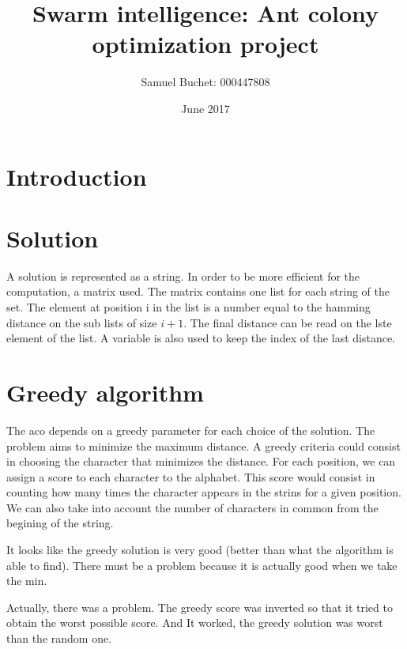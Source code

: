 \documentclass{article}
\title{Swarm intelligence: Ant colony optimization project}
\author{Samuel Buchet: 000447808}
\date{June 2017}
\begin{document}
\maketitle

\section{Introduction}

\section{Solution}

A solution is represented as a string.
In order to be more efficient for the computation, a matrix used.
The matrix contains one list for each string of the set.
The element at position i in the list is a number equal to the hamming distance
on the sub lists of size $i+1$.
The final distance can be read on the lste element of the list.
A variable is also used to keep the index of the last distance.

\section{Greedy algorithm}

The aco depends on a greedy parameter for each choice of the solution.
The problem aims to minimize the maximum distance.
A greedy criteria could consist in choosing the character that minimizes the distance.
For each position, we can assign a score to each character to the alphabet.
This score would consist in counting how many times the character appears in the strins for a given position.
We can also take into account the number of characters in common from the begining of the string. \newline

It looks like the greedy solution is very good (better than what the algorithm is able to find).
There must be a problem because it is actually good when we take the min. \newline

Actually, there was a problem.
The greedy score was inverted so that it tried to obtain the worst possible score.
And It worked, the greedy solution was worst than the random one.
\end{document}
